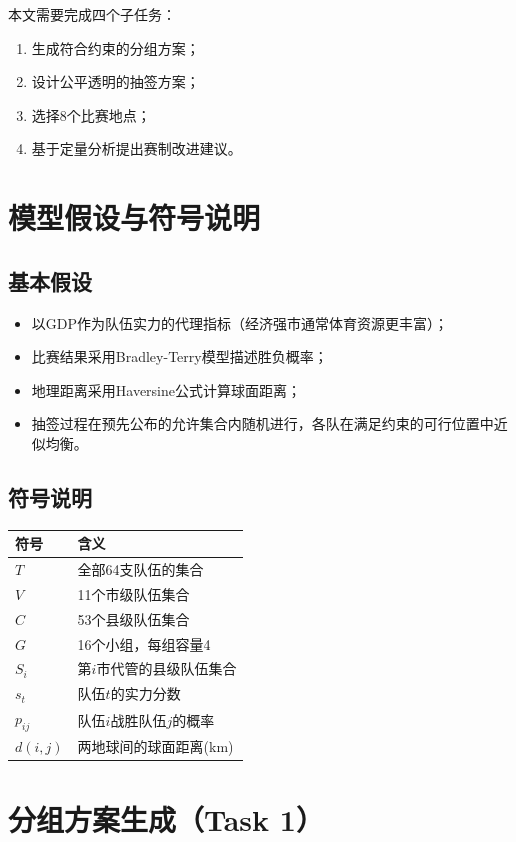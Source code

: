 \documentclass[a4paper,12pt]{article}
\begin{document}
本文需要完成四个子任务：
\begin{enumerate}
    \item 生成符合约束的分组方案；
    \item 设计公平透明的抽签方案；
    \item 选择8个比赛地点；
    \item 基于定量分析提出赛制改进建议。
\end{enumerate}

\section{模型假设与符号说明}

\subsection{基本假设}
\begin{itemize}
    \item 以GDP作为队伍实力的代理指标（经济强市通常体育资源更丰富）；
    \item 比赛结果采用Bradley-Terry模型描述胜负概率；
    \item 地理距离采用Haversine公式计算球面距离；
    \item 抽签过程在预先公布的允许集合内随机进行，各队在满足约束的可行位置中近似均衡。
\end{itemize}

\subsection{符号说明}
\begin{table}[H]
\centering
\begin{tabular}{ll}
\toprule
符号 & 含义 \\
\midrule
$T$ & 全部64支队伍的集合 \\
$V$ & 11个市级队伍集合 \\
$C$ & 53个县级队伍集合 \\
$G$ & 16个小组，每组容量4 \\
$S_i$ & 第$i$市代管的县级队伍集合 \\
$s_t$ & 队伍$t$的实力分数 \\
$p_{ij}$ & 队伍$i$战胜队伍$j$的概率 \\
$d(i,j)$ & 两地球间的球面距离(km) \\
\bottomrule
\end{tabular}
\end{table}

\section{分组方案生成（Task 1）}
\end{document}
